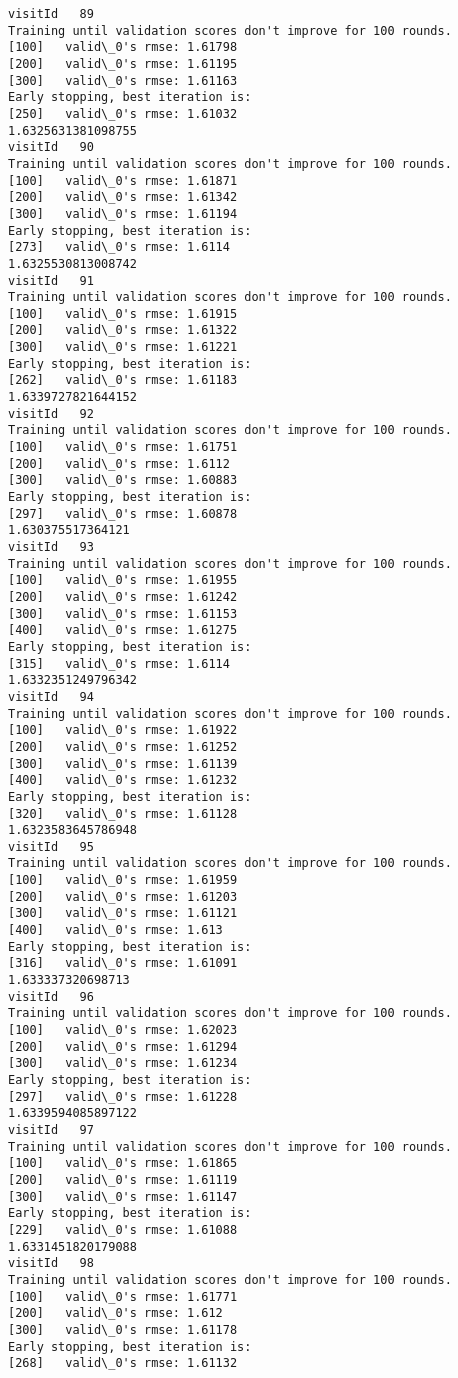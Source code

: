 \documentclass[11pt]{article}
\begin{document}
\begin{Verbatim}[commandchars=\\\{\}]
visitId   89
Training until validation scores don't improve for 100 rounds.
[100]	valid\_0's rmse: 1.61798
[200]	valid\_0's rmse: 1.61195
[300]	valid\_0's rmse: 1.61163
Early stopping, best iteration is:
[250]	valid\_0's rmse: 1.61032
1.6325631381098755
visitId   90
Training until validation scores don't improve for 100 rounds.
[100]	valid\_0's rmse: 1.61871
[200]	valid\_0's rmse: 1.61342
[300]	valid\_0's rmse: 1.61194
Early stopping, best iteration is:
[273]	valid\_0's rmse: 1.6114
1.6325530813008742
visitId   91
Training until validation scores don't improve for 100 rounds.
[100]	valid\_0's rmse: 1.61915
[200]	valid\_0's rmse: 1.61322
[300]	valid\_0's rmse: 1.61221
Early stopping, best iteration is:
[262]	valid\_0's rmse: 1.61183
1.6339727821644152
visitId   92
Training until validation scores don't improve for 100 rounds.
[100]	valid\_0's rmse: 1.61751
[200]	valid\_0's rmse: 1.6112
[300]	valid\_0's rmse: 1.60883
Early stopping, best iteration is:
[297]	valid\_0's rmse: 1.60878
1.630375517364121
visitId   93
Training until validation scores don't improve for 100 rounds.
[100]	valid\_0's rmse: 1.61955
[200]	valid\_0's rmse: 1.61242
[300]	valid\_0's rmse: 1.61153
[400]	valid\_0's rmse: 1.61275
Early stopping, best iteration is:
[315]	valid\_0's rmse: 1.6114
1.6332351249796342
visitId   94
Training until validation scores don't improve for 100 rounds.
[100]	valid\_0's rmse: 1.61922
[200]	valid\_0's rmse: 1.61252
[300]	valid\_0's rmse: 1.61139
[400]	valid\_0's rmse: 1.61232
Early stopping, best iteration is:
[320]	valid\_0's rmse: 1.61128
1.6323583645786948
visitId   95
Training until validation scores don't improve for 100 rounds.
[100]	valid\_0's rmse: 1.61959
[200]	valid\_0's rmse: 1.61203
[300]	valid\_0's rmse: 1.61121
[400]	valid\_0's rmse: 1.613
Early stopping, best iteration is:
[316]	valid\_0's rmse: 1.61091
1.633337320698713
visitId   96
Training until validation scores don't improve for 100 rounds.
[100]	valid\_0's rmse: 1.62023
[200]	valid\_0's rmse: 1.61294
[300]	valid\_0's rmse: 1.61234
Early stopping, best iteration is:
[297]	valid\_0's rmse: 1.61228
1.6339594085897122
visitId   97
Training until validation scores don't improve for 100 rounds.
[100]	valid\_0's rmse: 1.61865
[200]	valid\_0's rmse: 1.61119
[300]	valid\_0's rmse: 1.61147
Early stopping, best iteration is:
[229]	valid\_0's rmse: 1.61088
1.6331451820179088
visitId   98
Training until validation scores don't improve for 100 rounds.
[100]	valid\_0's rmse: 1.61771
[200]	valid\_0's rmse: 1.612
[300]	valid\_0's rmse: 1.61178
Early stopping, best iteration is:
[268]	valid\_0's rmse: 1.61132

\end{Verbatim}
\end{document}
